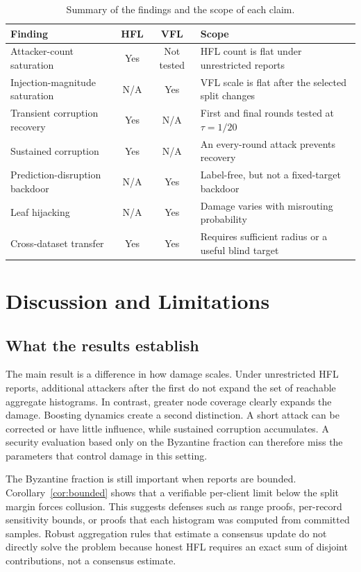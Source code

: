\documentclass[11pt]{article}
\begin{document}
\begin{table}
\centering
\caption{Summary of the findings and the scope of each claim.}
\begin{tabular}{lccp{5.8cm}}
\toprule
Finding & HFL & VFL & Scope \\
\midrule
Attacker-count saturation & Yes & Not tested & HFL count is flat under unrestricted reports \\
Injection-magnitude saturation & N/A & Yes & VFL scale is flat after the selected split changes \\
Transient corruption recovery & Yes & N/A & First and final rounds tested at $\tau=1/20$ \\
Sustained corruption & Yes & N/A & An every-round attack prevents recovery \\
Prediction-disruption backdoor & N/A & Yes & Label-free, but not a fixed-target backdoor \\
Leaf hijacking & N/A & Yes & Damage varies with misrouting probability \\
Cross-dataset transfer & Yes & Yes & Requires sufficient radius or a useful blind target \\
\bottomrule
\end{tabular}
\label{tab:summary}
\end{table}

\FloatBarrier

\section{Discussion and Limitations}
\label{sec:discussion}

\subsection{What the results establish}

The main result is a difference in how damage scales. Under unrestricted HFL reports, additional attackers after the first do not expand the set of reachable aggregate histograms. In contrast, greater node coverage clearly expands the damage. Boosting dynamics create a second distinction. A short attack can be corrected or have little influence, while sustained corruption accumulates. A security evaluation based only on the Byzantine fraction can therefore miss the parameters that control damage in this setting.

The Byzantine fraction is still important when reports are bounded. Corollary~\ref{cor:bounded} shows that a verifiable per-client limit below the split margin forces collusion. This suggests defenses such as range proofs, per-record sensitivity bounds, or proofs that each histogram was computed from committed samples. Robust aggregation rules that estimate a consensus update do not directly solve the problem because honest HFL requires an exact sum of disjoint contributions, not a consensus estimate.
\end{document}
